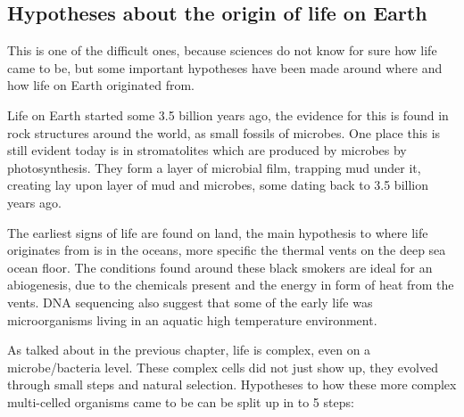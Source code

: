 \subsection{Hypotheses about the origin of life on Earth}
This is one of the difficult ones, because sciences do not know for sure how life came to be, but some important hypotheses have been made around where and how life on Earth originated from.

Life on Earth started some 3.5 billion years ago, the evidence for this is found in rock structures around the world, as small fossils of microbes. One place this is still evident today is in stromatolites which are produced by microbes by photosynthesis. They form a layer of microbial film, trapping mud under it, creating lay upon layer of mud and microbes, some dating back to 3.5 billion years ago.

The earliest signs of life are found on land, the main hypothesis to where life originates from is in the oceans, more specific the thermal vents on the deep sea ocean floor. The conditions found around these black smokers are ideal for an abiogenesis, due to the chemicals present and the energy in form of heat from the vents. DNA sequencing also suggest that some of the early life was microorganisms living in an aquatic high temperature environment.

As talked about in the previous chapter, life is complex, even on a microbe/bacteria level. These complex cells did not just show up, they evolved through small steps and natural selection. Hypotheses to how these more complex multi-celled organisms came to be can be split up in to 5 steps:


